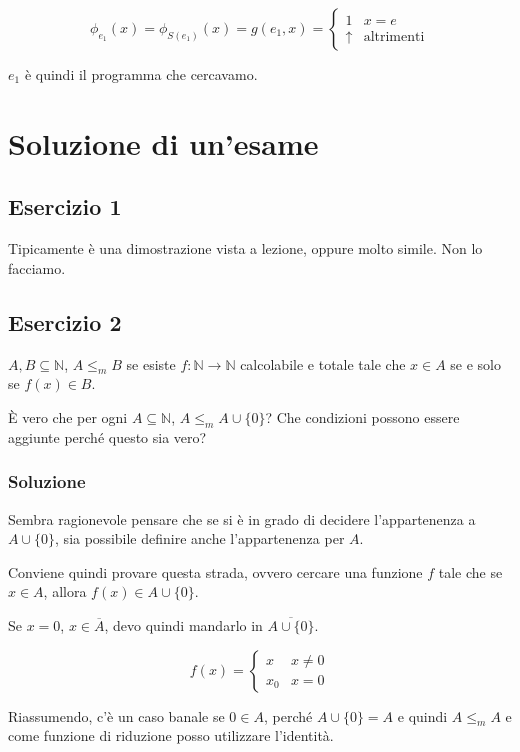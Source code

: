 $$\phi_{e_1}(x) = \phi_{S(e_1)}(x) = g(e_1, x) = \begin{cases}
1 &x = e \\
\uparrow &\text{altrimenti}
\end{cases}$$

$e_1$ è quindi il programma che cercavamo.

\section{Soluzione di un'esame} 

\subsection{Esercizio 1}

Tipicamente è una dimostrazione vista a lezione, oppure molto simile.
Non lo facciamo.

\subsection{Esercizio 2}

$A, B \subseteq \mathbb{N}$, $A \leq_m B$ se esiste $f : \mathbb{N} \rightarrow \mathbb{N}$ calcolabile e totale tale che $x \in A$ se e solo se $f(x) \in B$.

\`{E} vero che per ogni $A \subseteq \mathbb{N}$, $A \leq_m A \cup \{0\}$? Che condizioni possono essere aggiunte perché questo sia vero?

\subsubsection{Soluzione}

Sembra ragionevole pensare che se si è in grado di decidere l'appartenenza a $A \cup \{0\}$, sia possibile definire anche l'appartenenza per $A$.

Conviene quindi provare questa strada, ovvero cercare una funzione $f$ tale che se $x \in A$, allora $f(x) \in A\cup \{0\}$.

Se $x =0$, $x \in \overline{A}$, devo quindi mandarlo in $\overline{A \cup \{0\} }$.

$$
f(x) = \begin{cases}
x &x \neq 0 \\
x_0 &x = 0
\end{cases}
$$

Riassumendo, c'è un caso banale se $0 \in A$, perché $A \cup \{0\} = A$ e quindi $A \leq_m A$ e come funzione di riduzione posso utilizzare l'identità.

